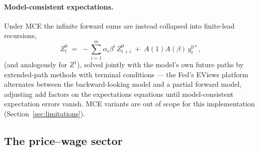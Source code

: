 \paragraph{Model-consistent expectations.} Under MCE the infinite forward sums are instead collapsed into finite-lead recursions,
\begin{equation}
Z^{0}_t \;=\; -\sum_{i=1}^{m}\alpha_i\beta^{i}\, Z^{0}_{t+i} \;+\; A(1)A(\beta)\,y^{0*}_t,
\label{eq:mce-z}
\end{equation}
(and analogously for $Z^1$), solved jointly with the model's own future paths by extended-path methods with terminal conditions --- the Fed's EViews platform alternates between the backward-looking model and a partial forward model, adjusting add factors on the expectations equations until model-consistent expectation errors vanish. MCE variants are out of scope for this implementation (Section~\ref{sec:limitations}).

\subsection{The price--wage sector}
\label{sec:pw}

